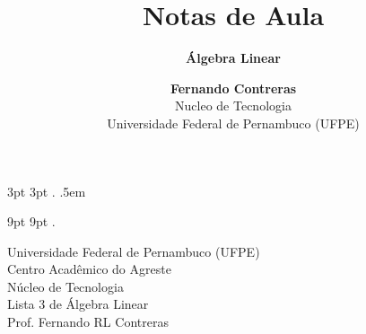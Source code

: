 \theoremstyle{note}
\newtheorem{note}{Note}

  {3pt}%
  {3pt}%
  {\itshape}%
  {}%
  {\bfseries}%
  {.}%
  {.5em}%
  {}%

\theoremstyle{citing}
\newtheorem*{varthm}{}%

  {9pt}%
  {9pt}%
  {\itshape}%
  {}%
  {\bfseries}%
  {.}%
  {\newline}%
  {}%

\theoremstyle{break}
\newtheorem{bthm}{B-Theorem}

\theoremstyle{exercise}
\newtheorem{exer}{Exercise}

\swapnumbers
\theoremstyle{plain}
\newtheorem{thmsw}{Theorem}[section]
\newtheorem{propsw}{Proposition}

\let\lvert=|\let\rvert=|
\newcommand{\Ric}{\mathop{\mathrm{Ric}}\nolimits}

\addtolength{\textwidth}{8pt}

\title{ \textbf{Notas de Aula}}
\subtitle{\textbf{Álgebra Linear}}
\author{\textbf{Fernando Contreras}\\
	\large Nucleo de Tecnologia\\
	Universidade Federal de Pernambuco (UFPE)}




	\begin{center}
		Universidade Federal de Pernambuco (UFPE)\\
		Centro Acadêmico do Agreste\\
		Núcleo de Tecnologia\\
		
		Lista 3 de Álgebra Linear\\
		Prof. Fernando RL Contreras
	\end{center}


